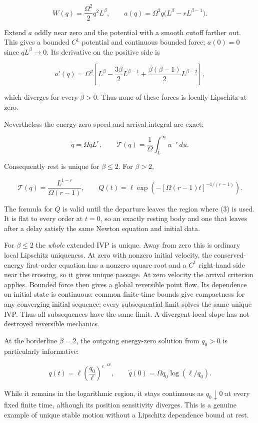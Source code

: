 \documentclass[11pt,a4paper]{article}
\begin{document}
\[
 W(q)=\frac{\Omega^2}{2}q^2 L^\beta,\qquad
 a(q)=\Omega^2q\bigl(L^\beta-rL^{\beta-1}\bigr).
 \tag{3}
\]

Extend \(a\) oddly near zero and the potential with a smooth cutoff
farther out. This gives a bounded \(C^1\) potential and continuous
bounded force; \(a(0)=0\) since \(q L^\beta\to0\). Its derivative on the
positive side is

\[
 a'(q)=\Omega^2\left[L^\beta-\frac{3\beta}{2}L^{\beta-1}
              +\frac{\beta(\beta-1)}2L^{\beta-2}\right],
 \tag{4}
\]

which diverges for every \(\beta>0\). Thus none of these forces is
locally Lipschitz at zero.

Nevertheless the energy-zero speed and arrival integral are exact:

\[
 \dot q=\Omega qL^r,\qquad
 \mathcal T(q)=\frac1\Omega\int_L^\infty u^{-r}\,du.
 \tag{5}
\]

Consequently rest is unique for \(\beta\le2\). For \(\beta>2\),

\[
 \mathcal T(q)=\frac{L^{1-r}}{\Omega(r-1)},\qquad
 Q(t)=\ell\exp\left(-[\Omega(r-1)t]^{-1/(r-1)}\right).
 \tag{6}
\]

The formula for \(Q\) is valid until the departure leaves the region
where (3) is used. It is flat to every order at \(t=0\), so an exactly
resting body and one that leaves after a delay satisfy the same Newton
equation and initial data.

For \(\beta\le2\) the \emph{whole} extended IVP is unique. Away from
zero this is ordinary local Lipschitz uniqueness. At zero with nonzero
initial velocity, the conserved-energy first-order equation has a
nonzero square root and a \(C^1\) right-hand side near the crossing, so
it gives unique passage. At zero velocity the arrival criterion applies.
Bounded force then gives a global reversible point flow. Its dependence
on initial state is continuous: common finite-time bounds give
compactness for any converging initial sequence; every subsequential
limit solves the same unique IVP. Thus all subsequences have the same
limit. A divergent local slope has not destroyed reversible mechanics.

At the borderline \(\beta=2\), the outgoing energy-zero solution from
\(q_0>0\) is particularly informative:

\[
 q(t)=\ell\left(\frac{q_0}{\ell}\right)^{e^{-\Omega t}},
 \qquad \dot q(0)=\Omega q_0\log(\ell/q_0).
 \tag{7}
\]

While it remains in the logarithmic region, it stays continuous as
\(q_0\downarrow0\) at every fixed finite time, although its position
sensitivity diverges. This is a genuine example of unique stable motion
without a Lipschitz dependence bound at rest.
\end{document}
